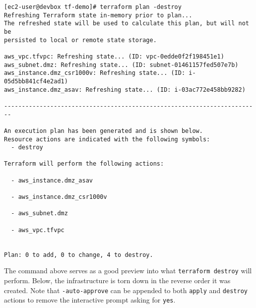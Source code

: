 \begin{verbatim}
[ec2-user@devbox tf-demo]# terraform plan -destroy
Refreshing Terraform state in-memory prior to plan...
The refreshed state will be used to calculate this plan, but will not be
persisted to local or remote state storage.

aws_vpc.tfvpc: Refreshing state... (ID: vpc-0edde0f2f198451e1)
aws_subnet.dmz: Refreshing state... (ID: subnet-01461157fed507e7b)
aws_instance.dmz_csr1000v: Refreshing state... (ID: i-05d5bb841cf4e2ad1)
aws_instance.dmz_asav: Refreshing state... (ID: i-03ac772e458bb9282)

------------------------------------------------------------------------

An execution plan has been generated and is shown below.
Resource actions are indicated with the following symbols:
  - destroy

Terraform will perform the following actions:

  - aws_instance.dmz_asav

  - aws_instance.dmz_csr1000v

  - aws_subnet.dmz

  - aws_vpc.tfvpc


Plan: 0 to add, 0 to change, 4 to destroy.
\end{verbatim}

The command above serves as a good preview into what \verb|terraform destroy| will
perform. Below, the infrastructure is torn down in the reverse order it was
created. Note that \verb|-auto-approve| can be appended to both \verb|apply| and
\verb|destroy| actions to remove the interactive prompt asking for \verb|yes|.

